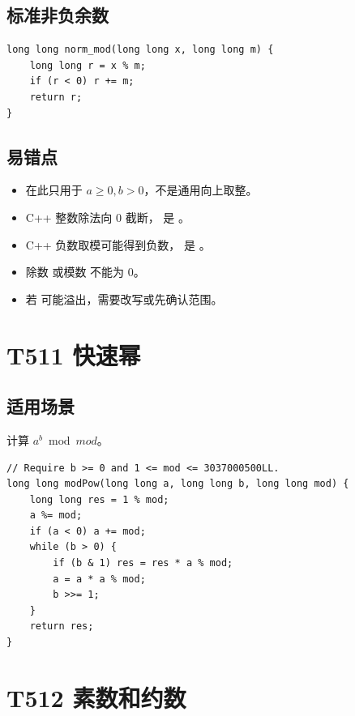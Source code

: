 \subsection{标准非负余数}

\begin{lstlisting}
long long norm_mod(long long x, long long m) {
    long long r = x % m;
    if (r < 0) r += m;
    return r;
}
\end{lstlisting}

\subsection{易错点}

\begin{itemize}
  \item {} 在此只用于 $a \ge 0, b > 0$，不是通用向上取整。
  \item C++ 整数除法向 0 截断， 是 。
  \item C++ 负数取模可能得到负数， 是 。
  \item 除数  或模数  不能为 0。
  \item 若  可能溢出，需要改写或先确认范围。
\end{itemize}

\section{T511 快速幂}\label{sec:09-36}\label{tpl:511}

\subsection{适用场景}

计算 $a^b \bmod mod$。

\begin{lstlisting}
// Require b >= 0 and 1 <= mod <= 3037000500LL.
long long modPow(long long a, long long b, long long mod) {
    long long res = 1 % mod;
    a %= mod;
    if (a < 0) a += mod;
    while (b > 0) {
        if (b & 1) res = res * a % mod;
        a = a * a % mod;
        b >>= 1;
    }
    return res;
}
\end{lstlisting}

\section{T512 素数和约数}\label{sec:09-37}\label{tpl:512}

